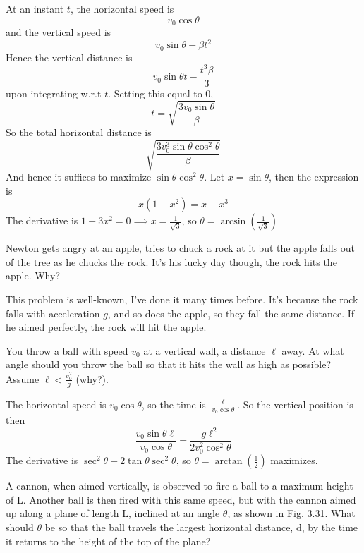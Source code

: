 \documentclass[11pt]{scrartcl}
\begin{document}
\begin{soln}
  At an instant $t$, the horizontal speed is $$v_0\cos\theta$$ and the
  vertical speed is $$v_0\sin\theta-\beta t^2$$
  Hence the vertical distance is
  $$v_0\sin\theta t-\frac{t^3\beta}{3}$$
  upon integrating w.r.t $t$. Setting this equal to $0$,
  $$t=\sqrt{\frac{3v_0\sin\theta}{\beta}}$$
  So the total horizontal distance is
  $$\sqrt{\frac{3v_0^3\sin\theta\cos^2\theta}{\beta}}$$
  And hence it suffices to maximize $\sin\theta\cos^2\theta$.
  Let $x=\sin\theta$, then the expression is
  $$x(1-x^2)=x-x^3$$
  The derivative is $1-3x^2=0\implies x=\frac{1}{\sqrt{3}}$, so
  $\theta=\arcsin\left(\frac{1}{\sqrt{3}}\right)$
\end{soln}
\begin{example}
  [3.44]
  Newton gets angry at an apple, tries to chuck a rock at it but the apple falls out of the tree as he chucks the rock.
  It's his lucky day though, the rock hits the apple. Why?
\end{example}
\begin{soln}
  This problem is well-known, I've done it many times before.
  It's because the rock falls with acceleration $g$,
  and so does the apple, so they fall the same distance. If he aimed perfectly,
  the rock will hit the apple.
\end{soln}
\begin{example}
  [3.47]
  You throw a ball with speed $v_0$ at a vertical wall, a distance $\ell$ away. At what angle should you throw the ball so that it hits the wall as high as
  possible? Assume $\ell<\frac{v_0^2}{g}$ (why?).
\end{example}
\begin{soln}
  The horizontal speed is $v_0\cos\theta$, so the time is $\frac{\ell}{v_0\cos\theta}$. So the vertical position is then
  $$\frac{v_0\sin\theta\ell}{v_0\cos\theta}-\frac{g\ell^2}{2v_0^2\cos^2\theta}$$
  The derivative is $\sec^2\theta-2\tan\theta\sec^2\theta$, so $\theta=\arctan\left(\frac12\right)$ maximizes.
\end{soln}
\begin{example}
  [3.48]
  A cannon, when aimed vertically, is observed to fire a ball to a maximum
  height of L. Another ball is then fired with this same speed, but with the
  cannon aimed up along a plane of length L, inclined at an angle $\theta$, as
  shown in Fig. 3.31. What should $\theta$ be so that the ball travels the largest
  horizontal distance, d, by the time it returns to the height of the top of
  the plane?
\end{example}
\end{document}
